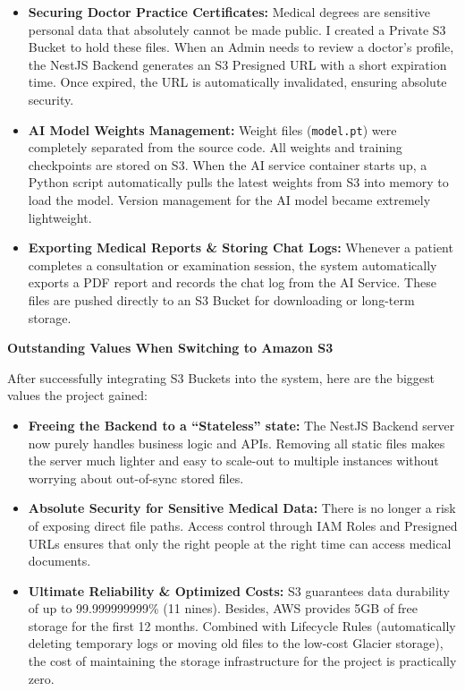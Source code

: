\begin{itemize}
\tightlist
\item
  \textbf{Securing Doctor Practice Certificates:} Medical degrees are
  sensitive personal data that absolutely cannot be made public. I
  created a Private S3 Bucket to hold these files. When an Admin needs
  to review a doctor's profile, the NestJS Backend generates an S3
  Presigned URL with a short expiration time. Once expired, the URL is
  automatically invalidated, ensuring absolute security.
\item
  \textbf{AI Model Weights Management:} Weight files (\texttt{model.pt})
  were completely separated from the source code. All weights and
  training checkpoints are stored on S3. When the AI service container
  starts up, a Python script automatically pulls the latest weights from
  S3 into memory to load the model. Version management for the AI model
  became extremely lightweight.
\item
  \textbf{Exporting Medical Reports \& Storing Chat Logs:} Whenever a
  patient completes a consultation or examination session, the system
  automatically exports a PDF report and records the chat log from the
  AI Service. These files are pushed directly to an S3 Bucket for
  downloading or long-term storage.
\end{itemize}

\vspace{0.5em}\noindent\textbf{Outstanding Values When Switching to Amazon S3}

After successfully integrating S3 Buckets into the system, here are the
biggest values the project gained:

\begin{itemize}
\tightlist
\item
  \textbf{Freeing the Backend to a ``Stateless'' state:} The NestJS
  Backend server now purely handles business logic and APIs. Removing
  all static files makes the server much lighter and easy to scale-out
  to multiple instances without worrying about out-of-sync stored files.
\item
  \textbf{Absolute Security for Sensitive Medical Data:} There is no
  longer a risk of exposing direct file paths. Access control through
  IAM Roles and Presigned URLs ensures that only the right people at the
  right time can access medical documents.
\item
  \textbf{Ultimate Reliability \& Optimized Costs:} S3 guarantees data
  durability of up to 99.999999999\% (11 nines). Besides, AWS provides
  5GB of free storage for the first 12 months. Combined with Lifecycle
  Rules (automatically deleting temporary logs or moving old files to
  the low-cost Glacier storage), the cost of maintaining the storage
  infrastructure for the project is practically zero.
\end{itemize}

